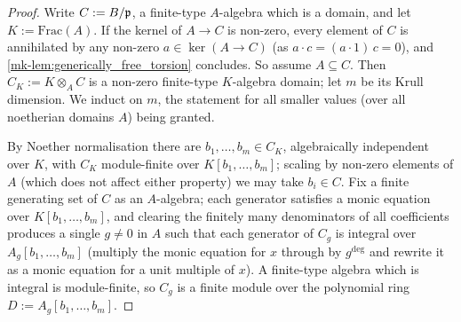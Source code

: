\begin{proof}
  \leanok
{}
  Write \(C := B/\mathfrak{p}\), a finite-type \(A\)-algebra which is a domain, and let
  \(K := \mathrm{Frac}(A)\).  If the kernel of \(A \to C\) is non-zero, every
  element of \(C\) is annihilated by any non-zero \(a \in \ker(A \to C)\)
  (as \(a \cdot c = (a \cdot 1)\, c = 0\)), and
  \ref{mk-lem:generically_free_torsion} concludes.  So assume \(A \subseteq C\).
  Then \(C_K := K \otimes_A C\) is a non-zero finite-type \(K\)-algebra domain;
  let \(m\) be its Krull dimension.  We induct on \(m\), the statement for all
  smaller values (over all noetherian domains \(A\)) being granted.

  By Noether normalisation there are \(b_1, \dots, b_m \in C_K\), algebraically
  independent over \(K\), with \(C_K\) module-finite over
  \(K[b_1, \dots, b_m]\); scaling by non-zero elements of \(A\) (which does not
  affect either property) we may take \(b_i \in C\).  Fix a finite generating
  set of \(C\) as an \(A\)-algebra; each generator satisfies a monic equation
  over \(K[b_1, \dots, b_m]\), and clearing the finitely many denominators of
  all coefficients produces a single \(g \ne 0\) in \(A\) such that each
  generator of \(C_g\) is integral over \(A_g[b_1, \dots, b_m]\) (multiply the
  monic equation for \(x\) through by \(g^{\deg}\) and rewrite it as a monic
  equation for a unit multiple of \(x\)).  A finite-type algebra which is
  integral is module-finite, so \(C_g\) is a finite module over the polynomial
  ring \(D := A_g[b_1, \dots, b_m]\).


\end{proof}
